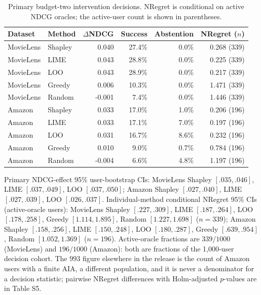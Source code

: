 \begin{table}[t]\centering\small
\caption{Primary budget-two intervention decisions. NRegret is conditional on active NDCG oracles; the active-user count is shown in parentheses.}
\label{tab:intervention-outcomes}
\begin{tabular}{llrrrr}
\toprule
Dataset & Method & $\Delta$NDCG & Success & Abstention & NRegret ($n$) \\
\midrule
MovieLens & Shapley & 0.040 & 27.4\% & 0.0\% & 0.268 (339) \\
MovieLens & LIME & 0.043 & 28.8\% & 0.0\% & 0.225 (339) \\
MovieLens & LOO & 0.043 & 28.9\% & 0.0\% & 0.217 (339) \\
MovieLens & Greedy & 0.006 & 10.3\% & 0.0\% & 1.471 (339) \\
MovieLens & Random & -0.001 & 7.4\% & 0.0\% & 1.446 (339) \\
\midrule
Amazon & Shapley & 0.033 & 17.0\% & 1.0\% & 0.206 (196) \\
Amazon & LIME & 0.033 & 17.1\% & 7.0\% & 0.197 (196) \\
Amazon & LOO & 0.031 & 16.7\% & 8.6\% & 0.232 (196) \\
Amazon & Greedy & 0.010 & 9.0\% & 0.7\% & 0.784 (196) \\
Amazon & Random & -0.004 & 6.6\% & 4.8\% & 1.197 (196) \\
\bottomrule
\end{tabular}
\end{table}

\noindent Primary NDCG-effect 95\% user-bootstrap CIs: MovieLens Shapley $[.035,.046]$, LIME $[.037,.049]$, LOO $[.037,.050]$; Amazon Shapley $[.027,.040]$, LIME $[.027,.039]$, LOO $[.026,.037]$. Individual-method conditional NRegret 95\% CIs (active-oracle users): MovieLens Shapley $[.227,.309]$, LIME $[.187,.264]$, LOO $[.178,.258]$, Greedy $[1.114,1.895]$, Random $[1.227,1.698]$ ($n=339$); Amazon Shapley $[.158,.256]$, LIME $[.150,.248]$, LOO $[.180,.287]$, Greedy $[.639,.954]$, Random $[1.052,1.369]$ ($n=196$). Active-oracle fractions are $339/1000$ (MovieLens) and $196/1000$ (Amazon): both are fractions of the 1,000-user decision cohort. The $993$ figure elsewhere in the release is the count of Amazon users with a finite AIA, a different population, and it is never a denominator for a decision statistic; pairwise NRegret differences with Holm-adjusted $p$-values are in Table S5.